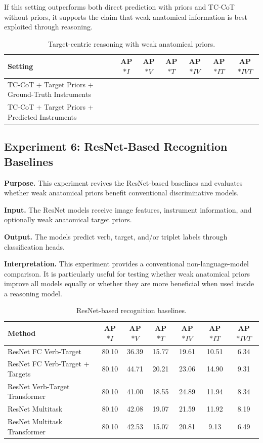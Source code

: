 \documentclass[11pt]{article}
\begin{document}
If this setting outperforms both direct prediction with priors and TC-CoT without priors, it supports the claim that weak anatomical information is best exploited through reasoning.

\begin{table}[H]
\centering
\caption{Target-centric reasoning with weak anatomical priors.}
\begin{tabular}{lcccccc}
\toprule
Setting & AP$*I$ & AP$*V$ & AP$*T$ & AP$*{IV}$ & AP$*{IT}$ & AP$*{IVT}$ \\
\midrule
TC-CoT + Target Priors + Ground-Truth Instruments & & & & & & \\
TC-CoT + Target Priors + Predicted Instruments & & & & & & \\
\bottomrule
\end{tabular}
\label{tab:tccot_priors}
\end{table}

\subsection{Experiment 6: ResNet-Based Recognition Baselines}

\textbf{Purpose.}
This experiment revives the ResNet-based baselines and evaluates whether weak anatomical priors benefit conventional discriminative models.

\textbf{Input.}
The ResNet models receive image features, instrument information, and optionally weak anatomical target priors.

\textbf{Output.}
The models predict verb, target, and/or triplet labels through classification heads.

\textbf{Interpretation.}
This experiment provides a conventional non-language-model comparison. It is particularly useful for testing whether weak anatomical priors improve all models equally or whether they are more beneficial when used inside a reasoning model.

\begin{table}[H]
\centering
\caption{ResNet-based recognition baselines.}
\begin{tabular}{lcccccc}
\toprule
Method & AP$*I$ & AP$*V$ & AP$*T$ & AP$*{IV}$ & AP$*{IT}$ & AP$*{IVT}$ \\
\midrule
ResNet FC Verb-Target & 80.10 & 36.39 & 15.77 & 19.61 & 10.51 & 6.34 \\
ResNet FC Verb-Target + Targets & 80.10 & 44.71 & 20.21 & 23.06 & 14.90 & 9.31 \\
ResNet Verb-Target Transformer & 80.10 & 41.00 & 18.55 & 24.89 & 11.94 & 8.34 \\
ResNet Multitask & 80.10 & 42.08 & 19.07 & 21.59 & 11.92 & 8.19 \\
ResNet Multitask Transformer & 80.10 & 42.53 & 15.07 & 20.81 & 9.13 & 6.49 \\
\bottomrule
\end{tabular}
\label{tab:resnet_baselines}
\end{table}
\end{document}
